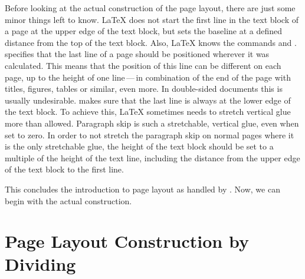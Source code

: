\begin{Explain}
  Before looking at the actual construction of the page layout, there
  are just some minor things left to know. {\LaTeX} does not start the
  first line in the text block of a page at the upper edge of the text
  block, but sets the baseline at a defined distance from the top of
  the text block. Also, {\LaTeX} knows the commands
   and
  . 
  specifies that the last line of a page should be positioned wherever
  it was calculated. This means that the position of this line can be
  different on each page, up to the height of one line\,---\,in
  combination of the end of the page with titles, figures, tables or
  similar, even more. In double-sided documents this is usually
  undesirable.  makes sure that the last line is
  always at the lower edge of the text block. To achieve this,
  {\LaTeX} sometimes needs to stretch vertical glue more than
  allowed. Paragraph skip is such a stretchable, vertical glue, even
  when set to zero.  In order to not stretch the paragraph skip on
  normal pages where it is the only stretchable glue, the height of
  the text block should be set to a multiple of the height of the text
  line, including the distance from the upper edge of the text block
  to the first line.

  This concludes the introduction to page layout as handled by
  {\KOMAScript}. Now, we can begin with the actual construction.
\end{Explain}


\section{Page Layout Construction by Dividing}
\label{sec:typearea.divConstruction}

